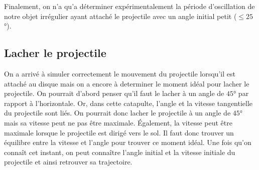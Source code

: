 \documentclass[10pt]{article}
\begin{document}
\pagebreak


Finalement, on n'a qu'a déterminer expérimentalement la période d'oscillation de notre objet irrégulier ayant attaché le projectile avec un angle
initial petit ($\leq 25$°).
\subsection{Lacher le projectile}

On a arrivé à simuler correctement le mouvement du projectile lorsqu'il est attaché au disque mais on a encore à determiner
le moment idéal pour lacher le projectile. On pourrait d'abord penser qu'il faut le lacher à un angle de $45$° par rapport à
l'horizontale. Or, dans cette catapulte, l'angle et la vitesse tangentielle du projectile sont liés.
On pourrait donc lacher le projectile à un angle de $45$° mais sa vitesse peut ne pas être maximale. Également, la vitesse
peut être maximale lorsque le projectile est dirigé vers le sol. Il faut donc trouver un équilibre entre la vitesse et l'angle
pour trouver ce moment idéal. Une fois qu'on connaît cet instant, on peut connaître l'angle initial et la vitesse initiale
du projectile et ainsi retrouver sa trajectoire. 
\end{document}
